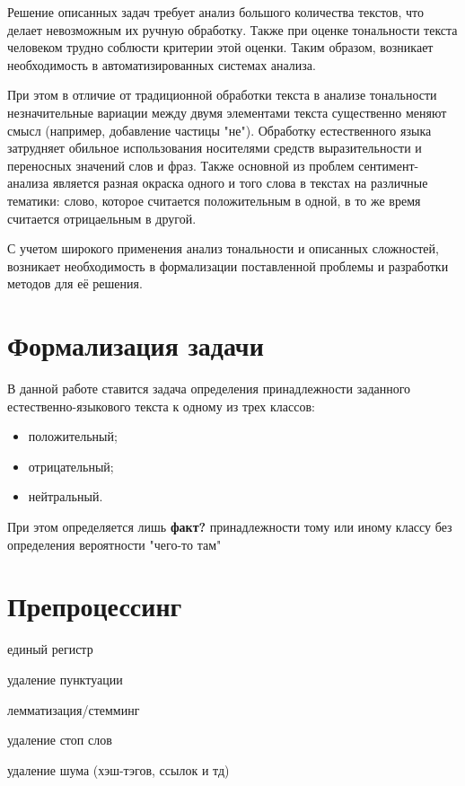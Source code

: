 Решение описанных задач требует анализ большого количества текстов, что
делает невозможным их ручную обработку. Также при оценке тональности текста
человеком трудно соблюсти критерии этой оценки. Таким образом, возникает
необходимость в автоматизированных системах анализа.

При этом в отличие от традиционной обработки текста в анализе тональности
незначительные вариации между двумя элементами текста существенно меняют смысл
(например, добавление частицы "не").  Обработку естественного языка затрудняет
обильное использования носителями средств выразительности и переносных значений
слов и фраз. Также основной из проблем сентимент-анализа является разная окраска
одного и того слова в текстах на различные тематики: слово, которое считается
положительным в одной, в то же время считается отрицаельным в другой.

С учетом широкого применения анализ тональности и описанных сложностей,
возникает необходимость в формализации поставленной проблемы и разработки
методов для её решения.

\section{Формализация задачи}

В данной работе ставится задача определения принадлежности заданного
естественно-языкового текста к одному из трех классов: 
\begin{itemize}
    \item положительный;
    \item отрицательный;
    \item нейтральный.
\end{itemize}

При этом определяется лишь \textbf{факт?} принадлежности тому или иному
классу без определения вероятности "чего-то там"

\section{Препроцессинг}

единый регистр

удаление пунктуации

лемматизация/стемминг

удаление стоп слов

удаление шума (хэш-тэгов, ссылок и тд)

